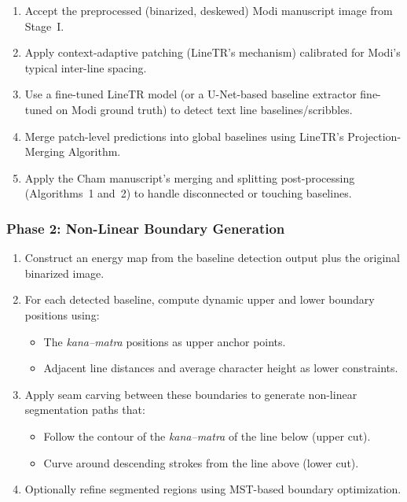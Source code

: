 \documentclass[11pt, a4paper]{article}
\begin{document}
\begin{enumerate}[leftmargin=1.5em]
    \item Accept the preprocessed (binarized, deskewed) Modi manuscript image from Stage~I.
    \item Apply context-adaptive patching (LineTR's mechanism) calibrated for Modi's typical inter-line spacing.
    \item Use a fine-tuned LineTR model (or a U-Net-based baseline extractor fine-tuned on Modi ground truth) to detect text line baselines/scribbles.
    \item Merge patch-level predictions into global baselines using LineTR's Projection-Merging Algorithm.
    \item Apply the Cham manuscript's merging and splitting post-processing (Algorithms~1 and~2) to handle disconnected or touching baselines.
\end{enumerate}

\subsubsection{Phase 2: Non-Linear Boundary Generation}

\begin{enumerate}[leftmargin=1.5em]
    \item Construct an energy map from the baseline detection output plus the original binarized image.
    \item For each detected baseline, compute dynamic upper and lower boundary positions using:
    \begin{itemize}
        \item The \textit{kana--matra} positions as upper anchor points.
        \item Adjacent line distances and average character height as lower constraints.
    \end{itemize}
    \item Apply seam carving between these boundaries to generate non-linear segmentation paths that:
    \begin{itemize}
        \item Follow the contour of the \textit{kana--matra} of the line below (upper cut).
        \item Curve around descending strokes from the line above (lower cut).
    \end{itemize}
    \item Optionally refine segmented regions using MST-based boundary optimization.
\end{enumerate}
\end{document}
